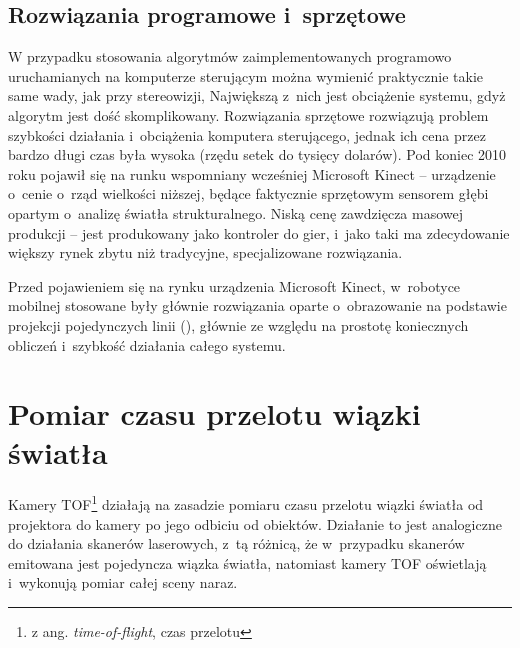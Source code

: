 \subsection{Rozwiązania programowe i~sprzętowe}

W przypadku stosowania algorytmów zaimplementowanych programowo uruchamianych na
komputerze sterującym można wymienić praktycznie takie same wady, jak przy
stereowizji, Największą z~nich jest obciążenie systemu, gdyż algorytm jest
dość skomplikowany. Rozwiązania sprzętowe rozwiązują problem szybkości działania
i~obciążenia komputera sterującego, jednak ich cena przez bardzo długi czas
była wysoka (rzędu setek do tysięcy dolarów). Pod koniec 2010 roku pojawił się
na runku wspomniany wcześniej Microsoft Kinect -- urządzenie o~cenie 
o~rząd wielkości niższej, będące faktycznie sprzętowym sensorem głębi opartym 
o~analizę światła strukturalnego. Niską cenę zawdzięcza masowej produkcji -- jest
produkowany jako kontroler do gier, i~jako taki ma zdecydowanie większy rynek
zbytu niż tradycyjne, specjalizowane rozwiązania.

Przed pojawieniem się na rynku urządzenia Microsoft Kinect, w~robotyce mobilnej
stosowane były głównie rozwiązania oparte o~obrazowanie na podstawie projekcji
pojedynczych linii (\cite{120445,5246792}), głównie ze względu na prostotę
koniecznych obliczeń i~szybkość działania całego systemu.


\section{Pomiar czasu przelotu wiązki światła}

Kamery TOF\footnote{z ang. {\it time-of-flight}, czas przelotu} działają na zasadzie
pomiaru czasu przelotu wiązki światła od projektora do kamery po jego odbiciu od
obiektów. Działanie to jest analogiczne do działania skanerów laserowych, z~tą różnicą,
że w~przypadku skanerów emitowana jest pojedyncza wiązka światła, natomiast kamery TOF
oświetlają i~wykonują pomiar całej sceny naraz.

